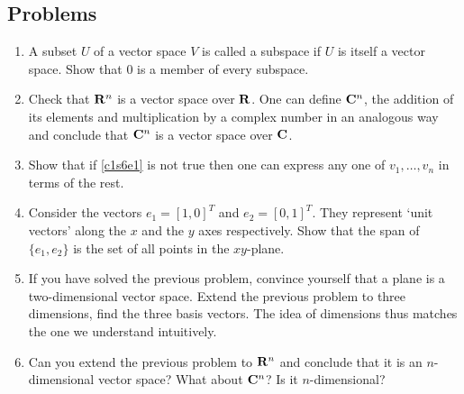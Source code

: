 \subsection{Problems}
\begin{enumerate}
\item A subset $U$ of a vector space $V$ is called a subspace if $U$ is itself
a vector space. Show that $0$ is a member of every subspace.
\item Check that $\mathbf{R}^n$ is a vector space over $\mathbf{R}$. One can
define $\mathbf{C}^n$, the addition of its elements and multiplication by a complex 
number in an analogous way and conclude that $\mathbf{C}^n$ is a vector space over
$\mathbf{C}$.
\item Show that if \eqref{c1s6e1} is not true then one can express any one of
$v_1, \ldots, v_n$ in terms of the rest.
\item Consider the vectors $e_1 = [1, 0]^T$ and $e_2 = [0, 1]^T$. They represent
`unit vectors' along the $x$ and the $y$ axes respectively. Show that the span
of $\{e_1, e_2\}$ is the set of all points in the $xy$-plane.
\item If you have solved the previous problem, convince yourself that a plane is
a two-dimensional vector space. Extend the previous problem to three dimensions,
find the three basis vectors. The idea of dimensions thus matches the one we 
understand intuitively.
\item Can you extend the previous problem to $\mathbf{R}^n$ and conclude that it is
an $n$-dimensional vector space? What about $\mathbf{C}^n$? Is it $n$-dimensional?
\end{enumerate}



